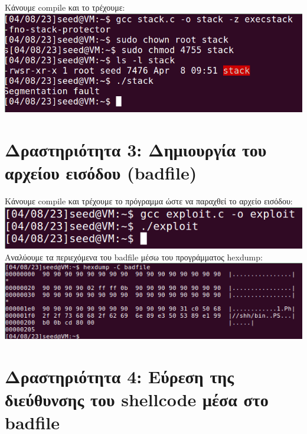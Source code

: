 \documentclass[12pt]{article}
\begin{document}


Κάνουμε compile και το τρέχουμε: \\

\includegraphics[width=\textwidth]{res/stack.png} \\

\section{Δραστηριότητα 3: Δημιουργία του αρχείου εισόδου (badfile)}



Κάνουμε compile και τρέχουμε το πρόγραμμα ώστε να παραχθεί το αρχείο εισόδου: \\

\includegraphics[width=\textwidth]{res/exploit.png} \\

Αναλύουμε τα περιεχόμενα του badfile μέσω του προγράμματος hexdump: \\

\includegraphics[width=\textwidth]{res/hexdump.png} \\

\section{Δραστηριότητα 4: Εύρεση της διεύθυνσης του shellcode μέσα στο badfile}
\end{document}
